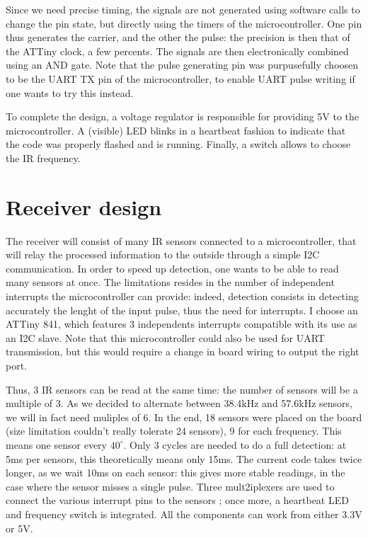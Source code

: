 \documentclass[a4paper,11pt]{article}
\begin{document}
Since we need precise timing, the signals are not generated using software calls to change the pin state, but directly using the timers of the microcontroller. One pin thus generates the carrier, and the other the pulse: the precision is then that of the ATTiny clock, a few percents. The signals are then electronically combined using an AND gate. Note that the pulse generating pin was purpusefully choosen to be the UART TX pin of the microcontroller, to enable UART pulse writing if one wants to try this instead.

To complete the design, a voltage regulator is responsible for providing 5V to the microcontroller. A (visible) LED blinks in a heartbeat fashion to indicate that the code was properly flashed and is running. Finally, a switch allows to choose the IR frequency.

\section{Receiver design}

The receiver will consist of many IR sensors connected to a microcontroller, that will relay the processed information to the outside through a simple I2C communication. In order to speed up detection, one wants to be able to read many sensors at once. The limitations resides in the number of independent interrupts the microcontroller can provide: indeed, detection consists in detecting accurately the lenght of the input pulse, thus the need for interrupts. I choose an ATTiny 841, which features 3 independents interrupts compatible with its use as an I2C slave. Note that this microcontroller could also be used for UART transmission, but this would require a change in board wiring to output the right port.

Thus, 3 IR sensors can be read at the same time: the number of sensors will be a multiple of 3. As we decided to alternate between 38.4kHz and 57.6kHz sensors, we will in fact need muliples of 6. In the end, 18 sensors were placed on the board (size limitation couldn't really tolerate 24 sensors), 9 for each frequency. This means one sensor every $40^\circ$. Only 3 cycles are needed to do a full detection: at 5ms per sensors, this theoretically means only 15ms. The current code takes twice longer, as we wait 10ms on each sensor: this gives more stable readings, in the case where the sensor misses a single pulse. Three mult2iplexers are used to connect the various interrupt pins to the sensors ; once more, a heartbeat LED and frequency switch is integrated. All the components can work from either 3.3V or 5V.
\end{document}
